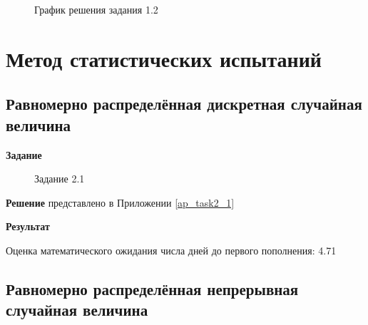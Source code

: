 \documentclass[otchet]{SCWorks}
\begin{document}
\begin{figure}[H]
	\caption{График решения задания 1.2}
	\label{res2}
\end{figure}

\section{Метод статистических испытаний}

\subsection{Равномерно распределённая дискретная случайная величина}

\textbf{Задание}

\begin{figure}[H]
	\caption{Задание 2.1}
	\label{pic3}
\end{figure}

\textbf{Решение} представлено в Приложении \ref{ap_task2_1}

\textbf{Результат} 

Оценка математического ожидания числа дней до первого пополнения: 4.71

\subsection{Равномерно распределённая непрерывная случайная величина}
\end{document}
